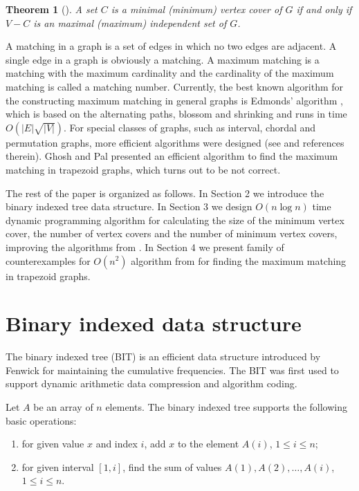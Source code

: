 \documentclass[11pt,letter]{article}
\newtheorem{thm}{Theorem}[section]
\begin{document}
\begin{thm}[\cite{CoLeRiSt01}]
\label{thm-ind} A set $C$ is a minimal (minimum) vertex cover of $G$ if and only if $V - C$ is an
maximal (maximum) independent set of $G$.
\end{thm}

A matching in a graph is a set of edges in which no two edges are adjacent. A single edge in a
graph is obviously a matching. A maximum matching is a matching with the maximum cardinality and
the cardinality of the maximum matching is called a matching number. Currently, the best known
algorithm for the constructing maximum matching in general graphs is Edmonds' algorithm
\cite{Ga80,MiVa80}, which is based on the alternating paths, blossom and shrinking and runs in time
$O(|E| \sqrt{ |V|})$. For special classes of graphs, such as interval, chordal and permutation
graphs, more efficient algorithms were designed (see \cite{AnAtChLe00,Ch96,ChPaCh97} and references
therein). Ghosh and Pal \cite{GhPa05} presented an efficient algorithm to find the maximum matching
in trapezoid graphs, which turns out to be not correct.

The rest of the paper is organized as follows. In Section 2 we introduce the binary indexed tree
data structure. In Section 3 we design $O (n \log n)$ time dynamic programming algorithm for
calculating the size of the minimum vertex cover, the number of vertex covers and the number of
minimum vertex covers, improving the algorithms from \cite{LiCh09}. In Section 4 we present family
of counterexamples for $O (n^2)$ algorithm from \cite{GhPa05} for finding the maximum matching in
trapezoid graphs.



\section{Binary indexed data structure}


The binary indexed tree (BIT) is an efficient data structure introduced by Fenwick \cite{Fe94} for
maintaining the cumulative frequencies. The BIT was first used to support dynamic arithmetic data
compression and algorithm coding.

Let $A$ be an array of $n$ elements. The binary indexed tree supports the following basic
operations:
\begin{enumerate}[($i$)]
\item for given value $x$ and index $i$, add $x$ to the element $A (i)$, $1 \leq i \leq n$;
\item for given interval $[1, i]$, find the sum of values $A (1), A (2), \ldots, A (i)$, $1 \leq i \leq n$.
\end{enumerate}
\end{document}

